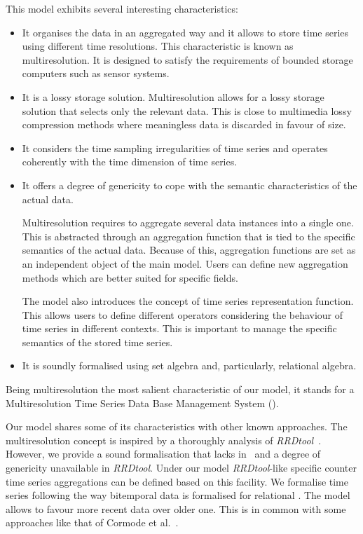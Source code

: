 This model exhibits several interesting characteristics:
\begin{itemize}
\item It organises the data in an aggregated way and it allows to
  store time series using different time resolutions. This
  characteristic is known as multiresolution. It is designed to
  satisfy the requirements of bounded storage computers such as sensor
  systems.

\item It is a lossy storage solution. Multiresolution allows for a
  lossy storage solution that selects only the relevant data. This is
  close to multimedia lossy compression methods where meaningless data
  is discarded in favour of size. 

\item It considers the time sampling irregularities of time series and
  operates coherently with the time dimension of time series.

\item It offers a degree of genericity to cope with the semantic
  characteristics of the actual data. 

  Multiresolution requires to aggregate several data instances into a
  single one. This is abstracted through an aggregation function that
  is tied to the specific semantics of the actual data. Because of
  this, aggregation functions are set as an independent object of the
  main model.  Users can define new aggregation methods which are
  better suited for specific fields.

  The model also introduces the concept of time series representation
  function.  This allows users to define different operators
  considering the behaviour of time series in different contexts. This
  is important to manage the specific semantics of the stored time
  series. 

\item It is soundly formalised using set algebra and, particularly,
  relational algebra.
\end{itemize}

Being multiresolution the most salient characteristic of our model, it
stands for a Multiresolution Time Series Data Base Management System
().

Our model shares some of its characteristics with other known
approaches.
%
The multiresolution concept is inspired by a thoroughly analysis of
\emph{RRDtool}~\cite{rrdtool}. However, we provide a sound
formalisation that lacks in~\cite{rrdtool} and a degree of genericity
unavailable in \emph{RRDtool}. Under our model \emph{RRDtool}-like
specific counter time series aggregations can be defined based on this
facility.
%
We formalise time series following the way bitemporal data is
formalised for relational .
%
The model allows to favour more recent data over older one. This is in
common with some approaches like that of Cormode et
al.~\cite{cormode08:pods}.

